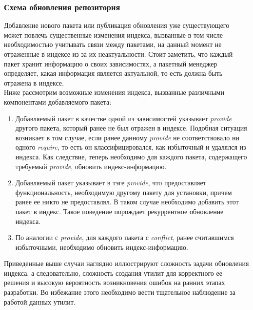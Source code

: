 \subsubsection{Схема обновления репозитория}
Добавление нового пакета или публикация обновления уже существующего
может повлечь существенные изменения индекса, вызванные в том числе
необходимостью учитывать связи между пакетами, на данный момент не
отраженные в индексе из-за их неактуальности. Стоит заметить, что 
каждый пакет хранит информацию о своих зависимостях, а пакетный
менеджер определяет, какая информация является актуальной, то есть
должна быть отражена в индексе.\\
Ниже рассмотрим возможные изменения индекса, вызванные различными
компонентами добавляемого пакета:
\begin{enumerate}
\item
Добавляемый пакет в качестве одной из зависимостей указывает \textit{provide}
другого пакета, который ранее не был отражен в индексе. Подобная ситуация
возникает в том случае, если ранее данному \textit{provide} не соответствовало ни 
одного \textit{require}, то есть он классифицировался, как избыточный и удалялся
из индекса. Как следствие, теперь необходимо для каждого пакета, содержащего
требуемый \textit{provide}, обновить индекс-информацию.
\item
Добавляемый пакет указывает в тэге \textit{provide}, что предоставляет функциональность,
необходимую другому пакету для установки, причем ранее ее никто не предоставлял. В таком
случае необходимо добавить этот пакет в индекс. 
Такое поведение порождает рекуррентное обновление индекса.
\item
По аналогии с \textit{provide}, для каждого пакета с \textit{conflict}, ранее считавшимся
избыточными, необходимо обновить индекс-информацию.

\end{enumerate}

Приведенные выше случаи наглядно иллюстрируют сложность задачи обновления индекса, а 
следовательно, сложность создания утилит для корректного ее решения и высокую вероятность
возникновения ошибок на ранних этапах разработки. Во избежание этого необходимо вести
тщательное наблюдение за работой данных утилит.
